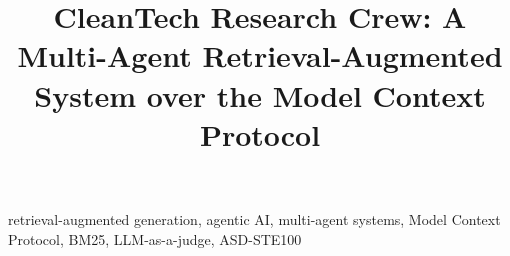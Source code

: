 \documentclass[conference]{IEEEtran}
\begin{document}
\title{CleanTech Research Crew: A Multi-Agent Retrieval-Augmented System over the Model Context Protocol}

\author{
}

\maketitle

\begin{abstract}
\end{abstract}

\begin{IEEEkeywords}
retrieval-augmented generation, agentic AI, multi-agent systems, Model Context Protocol, BM25, LLM-as-a-judge, ASD-STE100
\end{IEEEkeywords}




\end{document}

